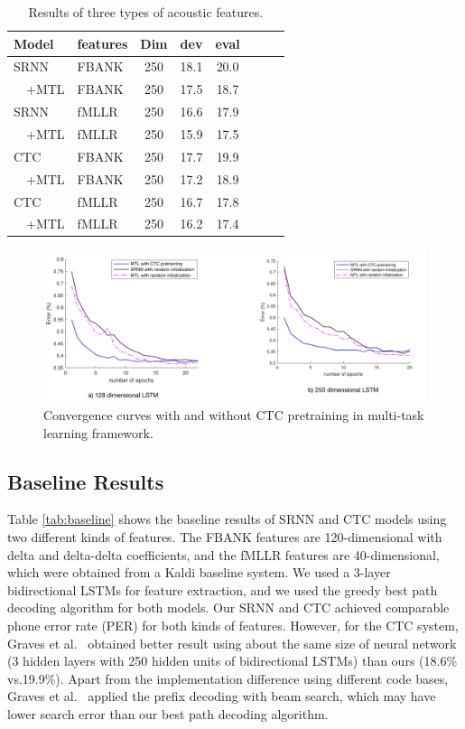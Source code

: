 \documentclass[a4paper]{article}
\begin{document}
\begin{table}
 \centering \small
\caption{Results of three types of acoustic features. }
\label{tab:mtl}
\begin{tabular}{ll|cccccc}
\hline

\hline
Model & features   & Dim & dev  & eval \\ \hline
SRNN & FBANK & 250 & 18.1 & 20.0 \\
$\quad$+MTL & FBANK& 250 &17.5& 18.7 \\
SRNN & fMLLR & 250 & 16.6 & 17.9 \\
$\quad$+MTL  & fMLLR & 250 & 15.9 & 17.5 \\ \hline
CTC & FBANK & 250 & 17.7 & 19.9\\ 
$\quad$+MTL & FBANK& 250 &  17.2 & 18.9 \\
CTC & fMLLR & 250 & 16.7 & 17.8 \\ 
$\quad$+MTL   & fMLLR & 250 & 16.2 & 17.4 \\ \hline

\hline
\end{tabular}
\vskip-2mm
\end{table}

\begin{figure}[t]
\small
\centerline{\includegraphics[width=1\textwidth]{ictc}} \vskip -2mm
\caption{Convergence curves with and without CTC pretraining in multi-task learning framework.}  
\label{fig:ctc-pretrain}
\vskip -2mm
\end{figure}

\subsection{Baseline Results}

Table \ref{tab:baseline} shows the baseline results of SRNN and CTC models using two different kinds of features. The FBANK features are 120-dimensional with delta and delta-delta coefficients, and the fMLLR features are 40-dimensional, which were obtained from a Kaldi baseline system. We used a 3-layer bidirectional LSTMs for feature extraction, and we used the greedy best path decoding algorithm for both models. Our SRNN and CTC achieved comparable phone error rate (PER) for both kinds of features. However, for the CTC system, Graves et al.~\cite{graves2013speech} obtained better result using about the same size of neural network (3 hidden layers with 250 hidden units of bidirectional LSTMs) than ours (18.6\% vs.19.9\%). Apart from the implementation difference using different code bases, Graves et al.~\cite{graves2013speech} applied the prefix decoding with beam search, which may have lower search error than our best path decoding algorithm. 
\end{document}
